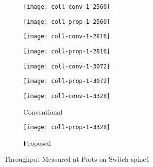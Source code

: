 \begin{figure}
    \centering

    \begin{subfigure}{.47\linewidth}
        \texttt{[image: coll-conv-1-2560]}
    \end{subfigure}
    \hfill
    \begin{subfigure}{.47\linewidth}
        \texttt{[image: coll-prop-1-2560]}
    \end{subfigure}

    \begin{subfigure}{.47\linewidth}
        \texttt{[image: coll-conv-1-2816]}
    \end{subfigure}
    \hfill
    \begin{subfigure}{.47\linewidth}
        \texttt{[image: coll-prop-1-2816]}
    \end{subfigure}

    \begin{subfigure}{.47\linewidth}
        \texttt{[image: coll-conv-1-3072]}
    \end{subfigure}
    \hfill
    \begin{subfigure}{.47\linewidth}
        \texttt{[image: coll-prop-1-3072]}
    \end{subfigure}

    \begin{subfigure}{.47\linewidth}
        \texttt{[image: coll-conv-1-3328]}
        \caption{Conventional}
    \end{subfigure}
    \hfill
    \begin{subfigure}{.47\linewidth}
        \texttt{[image: coll-prop-1-3328]}
        \caption{Proposed}
    \end{subfigure}

    \caption{Throughput Measured at Ports on Switch spine1}%
    \label{fig:coll-spine1-conv}
\end{figure}

